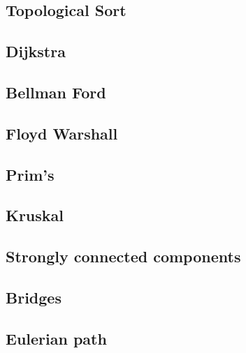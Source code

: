 \documentclass[9pt]{extarticle}
\begin{document}
\begin{multicols*}{3}
\subsection{Topological Sort}


\subsection{Dijkstra}


\subsection{Bellman Ford}


\subsection{Floyd Warshall}


\subsection{Prim's}


\subsection{Kruskal}


\subsection{Strongly connected components} %


\subsection{Bridges} %


\subsection{Eulerian path} %



\end{multicols*}
\end{document}
